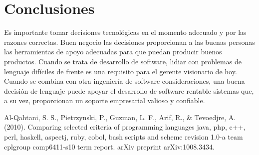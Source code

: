 \documentclass[twoside,twocolumn]{article}
\begin{document}
\section{Conclusiones}
Es importante tomar decisiones tecnológicas en el momento adecuado y por las razones correctas. Buen negocio
las decisiones proporcionan a las buenas personas las herramientas de apoyo adecuadas para que puedan producir buenos productos.
Cuando se trata de desarrollo de software, lidiar con problemas de lenguaje difíciles de frente es una
requisito para el gerente visionario de hoy. Cuando se combina con otra ingeniería de software
consideraciones, una buena decisión de lenguaje puede apoyar el desarrollo de software rentable
sistemas que, a su vez, proporcionan un soporte empresarial valioso y confiable.



\begin{thebibliography}{99} %

 
\newblock Al-Qahtani, S. S., Pietrzynski, P., Guzman, L. F., Arif, R., & Tevoedjre, A. (2010). Comparing selected criteria of programming languages java, php, c++, perl, haskell, aspectj, ruby, cobol, bash scripts and scheme revision 1.0-a team cplgroup comp6411-s10 term report. arXiv preprint arXiv:1008.3434.
\end{thebibliography}

\end{document}
